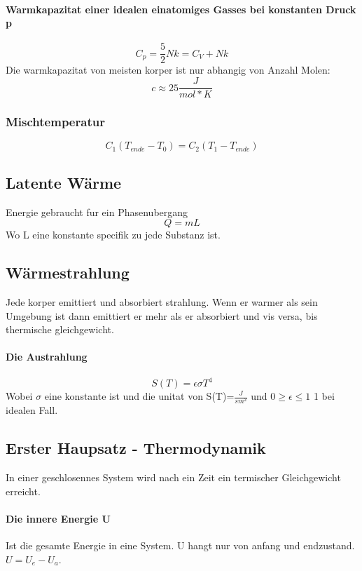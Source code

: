 \documentclass[7pt]{article}
\begin{document}
\begin{multicols*}{3}
\paragraph{Warmkapazitat einer idealen einatomiges Gasses bei konstanten Druck p}
\begin{equation}
	C_p=\frac{5}{2}Nk = C_V+Nk
\end{equation}
Die warmkapazitat von meisten korper ist nur abhangig von Anzahl Molen:
\begin{equation}
	c\approx 25\frac{J}{mol*K}
\end{equation}
\subsubsection{Mischtemperatur}
\begin{equation}
	C_1(T_{ende}-T_0)=C_2(T_{1}-T_{ende})
\end{equation}


\subsection{Latente W{\"a}rme}
Energie gebraucht fur ein Phasenubergang
\begin{equation}
	Q=mL
\end{equation}
Wo L eine konstante specifik zu jede Substanz ist.

\subsection{W{\"a}rmestrahlung}
Jede korper emittiert und absorbiert strahlung. Wenn er warmer als sein Umgebung ist dann emittiert er mehr als er absorbiert und vis versa, bis thermische gleichgewicht.
\paragraph{Die Austrahlung}
\begin{equation}
	S(T)=\epsilon\sigma T^4
\end{equation}
Wobei $\sigma$ eine konstante ist und die unitat von S(T)=$\frac{J}{sm^2}$ und $0\geq\epsilon \leq 1$ 1 bei idealen Fall.

\subsection{Erster Haupsatz - Thermodynamik}
In einer geschlosennes System wird nach ein Zeit ein termischer Gleichgewicht erreicht.
\paragraph{Die innere Energie U}
Ist die gesamte Energie in eine System. U hangt nur von anfang und endzustand. $U = U_e-U_a$.

\end{multicols*}
\end{document}
